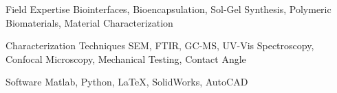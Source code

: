 


\begin{cvskills}

\cvskill
{Field Expertise}
{Biointerfaces, Bioencapsulation, Sol-Gel Synthesis, Polymeric Biomaterials,  Material Characterization}

\cvskill
{Characterization Techniques} %
{SEM, FTIR, GC-MS, UV-Vis Spectroscopy, Confocal Microscopy, Mechanical Testing, Contact Angle} %


\cvskill
{Software} %
{Matlab, Python, LaTeX, SolidWorks, AutoCAD} %




\end{cvskills}